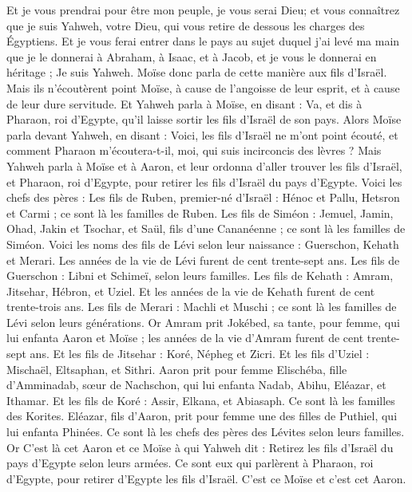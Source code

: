 \begin{multicols}{2}
Et je vous prendrai pour être mon peuple, je vous serai Dieu; et vous connaîtrez que je suis Yahweh, votre Dieu, qui vous retire de dessous les charges des Égyptiens.
Et je vous ferai entrer dans le pays au sujet duquel j’ai levé ma main que je le donnerai à Abraham, à Isaac, et à Jacob, et je vous le donnerai en héritage ; Je suis Yahweh.
Moïse donc parla de cette manière aux fils d'Israël. Mais ils n'écoutèrent point Moïse, à cause de l'angoisse de  leur esprit, et à cause de leur dure servitude.
Et Yahweh parla à Moïse, en disant :
Va, et dis à Pharaon, roi d'Egypte, qu'il laisse sortir les fils d'Israël de son pays.
Alors Moïse parla devant Yahweh, en disant : Voici, les fils d'Israël ne m'ont point écouté, et comment Pharaon m'écoutera-t-il, moi, qui suis incirconcis des lèvres ?
 Mais Yahweh parla à Moïse et à Aaron, et leur ordonna d'aller trouver les fils d'Israël, et Pharaon, roi d'Egypte, pour retirer les fils d'Israël du pays d'Egypte.
Voici les chefs des pères : Les fils de Ruben, premier-né d'Israël : Hénoc et Pallu, Hetsron et Carmi ; ce sont là les familles de Ruben.
Les fils de Siméon : Jemuel, Jamin, Ohad, Jakin et Tsochar, et Saül, fils d'une Cananéenne ; ce sont là les familles de Siméon.
Voici les noms des fils de Lévi selon leur naissance : Guerschon, Kehath et Merari. Les années de la vie de Lévi furent de cent trente-sept ans.
Les fils de Guerschon : Libni et Schimeï, selon leurs familles.
Les fils de Kehath : Amram, Jitsehar, Hébron, et Uziel. Et les années de la vie de Kehath furent de cent trente-trois ans.
Les fils de Merari : Machli et Muschi ; ce sont là les familles de Lévi selon leurs générations.
Or Amram prit Jokébed, sa tante, pour femme, qui lui enfanta Aaron et Moïse ; les années de la vie d’Amram furent de cent trente-sept ans.
Et les fils de Jitsehar : Koré, Népheg et Zicri.
Et les fils d’Uziel : Mischaël, Eltsaphan, et Sithri.
Aaron prit pour femme Elischéba, fille d’Amminadab, sœur de Nachschon, qui lui enfanta Nadab, Abihu, Eléazar, et Ithamar.
Et les fils de Koré : Assir, Elkana, et Abiasaph. Ce sont là les familles des Korites.
Eléazar, fils d'Aaron, prit pour femme une des filles de Puthiel, qui lui enfanta Phinées. Ce sont là les chefs des pères des Lévites selon leurs familles.
Or C'est là cet Aaron et ce Moïse à qui Yahweh dit : Retirez les fils d'Israël du pays d'Egypte selon leurs armées.
Ce sont eux qui parlèrent à Pharaon, roi d'Egypte, pour retirer d'Egypte les fils d'Israël. C'est ce Moïse et c'est cet Aaron.

\end{multicols}
